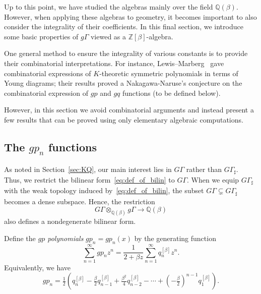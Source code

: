 \documentclass[dvipdfmx]{amsart}
\theoremstyle{definition}
\theoremstyle{remark}
\begin{document}
Up to this point, we have studied the algebras mainly over the field \( \mathbb{Q}(\beta) \).  
However, when applying these algebras to geometry, it becomes important to also consider the integrality of their coefficients.
In this final section, we introduce some basic properties of \( g\Gamma \) viewed as a \( \mathbb{Z}[\beta] \)-algebra.

One general method to ensure the integrality of various constants is to provide their combinatorial interpretations.  
For instance, Lewis–Marberg~\cite{LwMarberg2024} gave combinatorial expressions of \( K \)-theoretic symmetric polynomials in terms of Young diagrams; their results proved a Nakagawa-Naruse's conjecture \cite{nakagawa2017generating} on the combinatorial expression of $gp$ and $gq$ functions (to be defined below).

However, in this section we avoid combinatorial arguments and instead present a few results that can be proved using only elementary algebraic computations.

\subsection{The \( gp_n \) functions}

As noted in Section~\ref{sec:KQ}, our main interest lies in \( G\Gamma \) rather than \( G\Gamma_\sharp \).  
Thus, we restrict the bilinear form~\eqref{eq:def_of_bilin} to \( G\Gamma \).  
When we equip \( G\Gamma_\sharp \) with the weak topology induced by~\eqref{eq:def_of_bilin}, the subset \( G\Gamma \subsetneq G\Gamma_\sharp \) becomes a dense subspace.  
Hence, the restriction
\[
G\Gamma \otimes_{\mathbb{Q}(\beta)} g\Gamma \to \mathbb{Q}(\beta)
\]
also defines a nondegenerate bilinear form.

Define the \textit{$gp$ polynomials} \( gp_n = gp_n(x) \) by the generating function
\begin{equation}\label{eq:gp_to_q}
\sum_{n=1}^\infty gp_n z^n = \frac{1}{2 + \beta z} \sum_{n=1}^\infty q_n^{[\beta]} z^n.
\end{equation}
Equivalently, we have
\begin{equation}\label{eq:gp_to_qbeta}
gp_n = \tfrac{1}{2}\left(
q_n^{[\beta]} - \tfrac{\beta}{2} q_{n-1}^{[\beta]} + \tfrac{\beta^2}{4} q_{n-2}^{[\beta]} - \cdots + (-\tfrac{\beta}{2})^{n-1} q_1^{[\beta]}
\right).
\end{equation}
\end{document}
